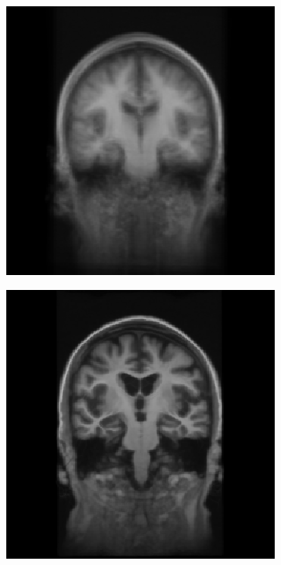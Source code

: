 \documentclass[10pt,twoside]{book}
\begin{document}
\begin{figure}
  \centering
  \begin{subfigure}{0.4\textwidth}
    \centering
    \includegraphics[width=\textwidth]{template_affine} 
    \caption{}
    \label{fig:averageTemplate_a}
  \end{subfigure}
  \hspace{4ex}
  \begin{subfigure}{0.4\textwidth}
    \centering
    \includegraphics[width=\textwidth]{template_warped} 

\end{subfigure}
\end{figure}
\end{document}
